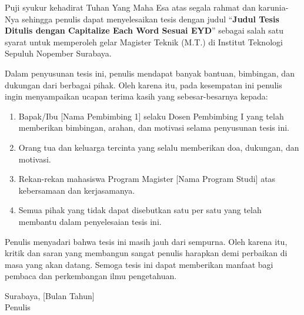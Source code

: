 
\begin{preface}

Puji syukur kehadirat Tuhan Yang Maha Esa atas segala rahmat dan karunia-Nya sehingga penulis dapat menyelesaikan tesis dengan judul ``\textbf{Judul Tesis Ditulis dengan Capitalize Each Word Sesuai EYD}'' sebagai salah satu syarat untuk memperoleh gelar Magister Teknik (M.T.) di Institut Teknologi Sepuluh Nopember Surabaya.

Dalam penyusunan tesis ini, penulis mendapat banyak bantuan, bimbingan, dan dukungan dari berbagai pihak. Oleh karena itu, pada kesempatan ini penulis ingin menyampaikan ucapan terima kasih yang sebesar-besarnya kepada:

\begin{enumerate}
    \item Bapak/Ibu [Nama Pembimbing 1] selaku Dosen Pembimbing I yang telah memberikan bimbingan, arahan, dan motivasi selama penyusunan tesis ini.
    \item Orang tua dan keluarga tercinta yang selalu memberikan doa, dukungan, dan motivasi.
    \item Rekan-rekan mahasiswa Program Magister [Nama Program Studi] atas kebersamaan dan kerjasamanya.
    \item Semua pihak yang tidak dapat disebutkan satu per satu yang telah membantu dalam penyelesaian tesis ini.
\end{enumerate}

Penulis menyadari bahwa tesis ini masih jauh dari sempurna. Oleh karena itu, kritik dan saran yang membangun sangat penulis harapkan demi perbaikan di masa yang akan datang. Semoga tesis ini dapat memberikan manfaat bagi pembaca dan perkembangan ilmu pengetahuan.

\vspace{1cm}

\begin{flushright}
    Surabaya, [Bulan Tahun]\\[1cm]
    Penulis
\end{flushright}

\end{preface}
